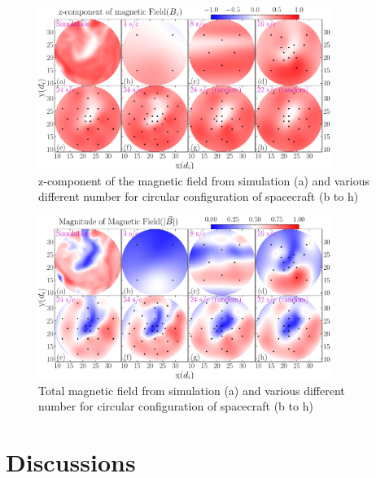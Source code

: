         \begin{figure}
            \begin{center}
                \includegraphics[width=0.85\textwidth]{figures/chap8/all_spc_bz_4_8_16_24_34_24_22_000.pdf}
                \caption[Reconstructed field (z-component), circular configuration]{z-component of the magnetic field from simulation (a) and various different number for circular configuration of spacecraft (b to h)}
                \label{fig:gpr_bz}
            \end{center}
        \end{figure}

        \begin{figure}
            \begin{center}
                \includegraphics[width=0.85\textwidth]{figures/chap8/all_spc_bm_4_8_16_24_34_24_22_000.pdf}
                \caption[Reconstructed field, circular configuration]{Total magnetic field from simulation (a) and various different number for circular configuration of spacecraft (b to h)}
                \label{fig:gpr_bm}
            \end{center}
        \end{figure}
        
    \section{Discussions} \label{sec:conc8}

